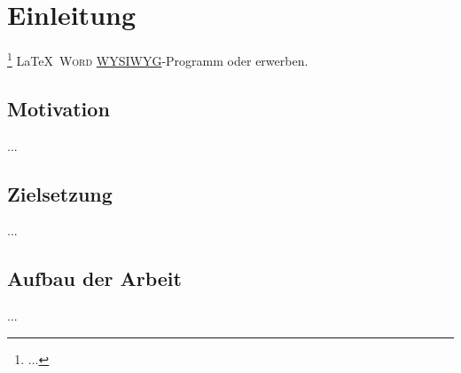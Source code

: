 \chapter{Einleitung}


\footnote{...}
\LaTeX\
\textsc{Word}
\href{https://de.wikipedia.org/wiki/WYSIWYG}{WYSIWYG}-Programm
\parencite{} oder \parencite{} erwerben.

\section{Motivation}

...

\section{Zielsetzung}

...

\section{Aufbau der Arbeit}

...

